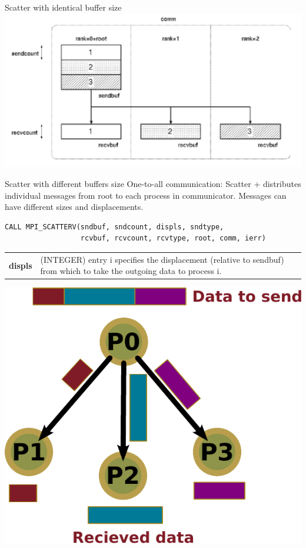 \documentclass[aspectratio=43]{beamer}
\begin{document}
\begin{frame}{Scatter with identical buffer size}
\includegraphics[scale=0.5]{03.MPI_Coll/scatter1.pdf}
\end{frame}

\begin{frame}[fragile]{Scatter with different buffers size}
One-to-all communication: Scatter + distributes individual messages from root to each process in communicator. Messages can have different sizes and displacements.\\
\footnotesize
\begin{verbatim}
CALL MPI_SCATTERV(sndbuf, sndcount, displs, sndtype,
                  rcvbuf, rcvcount, rcvtype, root, comm, ierr)
\end{verbatim}
\normalsize
\begin{black1block}{}
\begin{tabular}{rp{8cm}}
\textbf{displs} & (INTEGER) entry i specifies the displacement (relative to sendbuf) from which to take the outgoing data to process i.\\
\end{tabular}
\end{black1block}
\begin{center}
\includegraphics[scale=0.4]{03.MPI_Coll/scatterv.pdf}
\end{center}
\end{frame}
\end{document}
